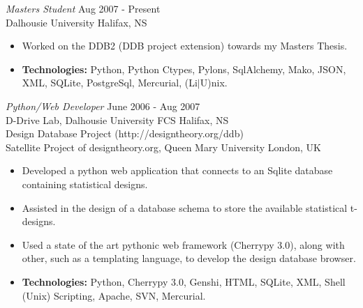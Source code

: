 \documentclass[line,margin]{res}
\begin{document}
\begin{resume}
   {\sl Masters Student} \hfill Aug 2007 - Present \\
     Dalhousie University \hfill Halifax, NS \smallskip
      \begin{itemize}  \itemsep -2pt %
       \item Worked on the DDB2 (DDB project extension)
       towards my Masters Thesis.
    \end{itemize} 

\newpage
\opening
\addvspace{\sectionskip}

      \begin{itemize}  \itemsep -2pt %
       \item {\bf Technologies:} \hspace{1pt} 
        Python, Python Ctypes, Pylons, SqlAlchemy, Mako, JSON, \newline 
        \hspace*{72pt} XML, SQLite, PostgreSql, Mercurial, 
        (Li$|$U)nix.
    \end{itemize} 

    {\sl Python/Web Developer} \hfill June 2006 - Aug 2007 \\
    D-Drive Lab, Dalhousie University FCS \hfill Halifax, NS \\
    Design Database Project (http://designtheory.org/ddb)\\
    Satellite Project of designtheory.org, 
    Queen Mary University \hfill London, UK \smallskip
        \begin{itemize}  \itemsep -2pt %
    \item Developed a python web application that connects to an Sqlite
    database \\ containing statistical designs.
    \item Assisted in the design of a database schema to store the available
    statistical t-designs.
    \item Used a state of the art pythonic web framework (Cherrypy 3.0), 
    along with other, such as a templating language, to develop the design 
    database browser. 
    \item {\bf Technologies:} \hspace{1pt} 
        Python, Cherrypy 3.0, Genshi, HTML, SQLite, XML, \newline
        \hspace*{72pt} Shell (Unix) Scripting, Apache, SVN, Mercurial.
        \end{itemize}


\end{resume}
\end{document}
